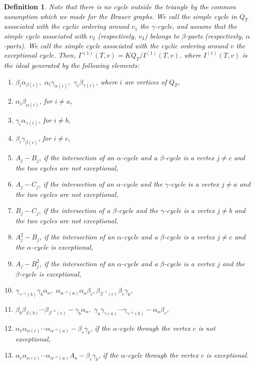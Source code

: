\documentclass[12pt]{amsart}
\newtheorem{definition}[thm]{Definition}
\numberwithin{equation}{thm}
\newcounter{ni}
\begin{document}
\begin{definition}
Note that there is no cycle outside the triangle by the common assumption which we made for the Brauer graphs. 
We call the simple cycle in $Q_{T}$ associated with the cyclic ordering around $v_{1}$ the $\gamma$-cycle, 
and assume that the simple cycle associated with $v_{2}$ (respectively, $v_{3}$) belongs to $\beta$-parts (respectively, $\alpha$-parts). 
We call the simple cycle associated with the cyclic ordering around $v$ \emph{the exceptional cycle}. 
Then, $\Gamma^{(1)}(T,v) = KQ_T/I^{(1)}(T,v)$, where $I^{(1)}(T,v)$ is the ideal 
generated by the following elements:
\begin{enumerate}
\item $\beta_i\alpha_{\beta(i)},$ $\alpha_i\gamma_{\alpha(i)},$ $\gamma_i\beta_{\gamma(i)}$, where $i$ are vertices of $Q_T$,
\item $\alpha_{i}\beta_{\alpha(i)}$, for $i\ne a$,
\item $\gamma_{i}\alpha_{\gamma(i)}$, for $i\ne b$,
\item $\beta_{i}\gamma_{\beta(i)}$, for $i\ne c$,
\item $A_j-B_j$, if the intersection of an $\alpha$-cycle and a $\beta$-cycle is a vertex $j\neq c$ and the two cycles are not exceptional,
\item $A_j-C_j$, if the intersection of an $\alpha$-cycle and the $\gamma$-cycle is a vertex $j\neq a$ and the two cycles are not exceptional,
\item $B_j-C_j$, if the intersection of a $\beta$-cycle and the $\gamma$-cycle is a vertex $j\neq b$ and the two cycles are not exceptional, 
\item $A_j^{2}-B_j$, if the intersection of an $\alpha$-cycle and a $\beta$-cycle is a vertex $j\neq c$ and the $\alpha$-cycle is exceptional,
\item $A_j-B_j^{2}$, if the intersection of an $\alpha$-cycle and a $\beta$-cycle is a vertex $j$ and the $\beta$-cycle is exceptional,
\item $\gamma_{\gamma^{-1}(b)}\gamma_{b}\alpha_{a},$ $\alpha_{\alpha^{-1}(a)}\alpha_{a}\beta_{c}, \beta_{\beta^{-1}(c)}\beta_{c}\gamma_{b}$,
\item $\beta_{b}\beta_{\beta(b)}\cdots\beta_{\beta^{-1}(c)}-\gamma_{b}\alpha_{a},$ $\gamma_{a}\gamma_{\gamma(a)}\cdots\gamma_{\gamma^{-1}(b)}-\alpha_{a}\beta_{c}$,
\item $\alpha_{c}\alpha_{\alpha(c)}\cdots\alpha_{\alpha^{-1}(a)}-\beta_{c}\gamma_{b}$, if the $\alpha$-cycle through the vertex $c$ is not exceptional,
\item $\alpha_{c}\alpha_{\alpha(c)}\cdots\alpha_{\alpha^{-1}(a)}A_{a}-\beta_{c}\gamma_{b}$, if the $\alpha$-cycle through the vertex $c$ is exceptional.
\end{enumerate}
\end{definition}
\end{document}
